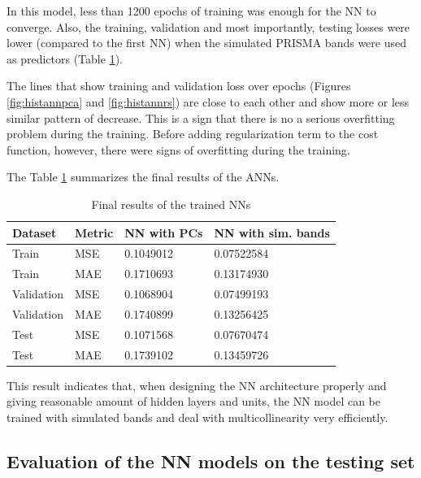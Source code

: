 \documentclass[a4paper, twoside]{templates/ociamthesis}
\begin{document}
In this model, less than 1200 epochs of training was enough for the NN to converge. Also, the training, validation and most importantly, testing losses were lower (compared to the first NN) when the simulated PRISMA bands were used as predictors (Table \ref{tab:losstable}).

The lines that show training and validation loss over epochs (Figures \ref{fig:histannpca} and \ref{fig:histannrs}) are close to each other and show more or less similar pattern of decrease. This is a sign that there is no a serious overfitting problem during the training. Before adding regularization term to the cost function, however, there were signs of overfitting during the training.

\newpage

The Table \ref{tab:losstable} summarizes the final results of the ANNs.

\begin{table}[H]

\caption{\label{tab:losstable}Final results of the trained NNs}
\centering
\begin{tabular}[t]{llll}
\toprule
Dataset & Metric & NN with PCs & NN with sim. bands\\
\midrule
Train & MSE & 0.1049012 & 0.07522584\\
Train & MAE & 0.1710693 & 0.13174930\\
Validation & MSE & 0.1068904 & 0.07499193\\
Validation & MAE & 0.1740899 & 0.13256425\\
Test & MSE & 0.1071568 & 0.07670474\\
\addlinespace
Test & MAE & 0.1739102 & 0.13459726\\
\bottomrule
\end{tabular}
\end{table}

This result indicates that, when designing the NN architecture properly and giving reasonable amount of hidden layers and units, the NN model can be trained with simulated bands and deal with multicollinearity very efficiently.

\hypertarget{evaluation-of-the-nn-models-on-the-testing-set}{%
\subsection{Evaluation of the NN models on the testing set}\label{evaluation-of-the-nn-models-on-the-testing-set}}
\end{document}
